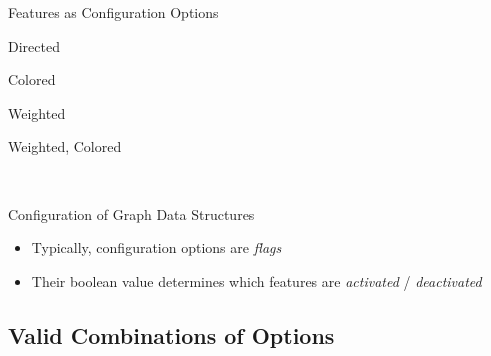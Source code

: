\begin{frame}{Features as Configuration Options}
	\begin{mycolumns}[columns=3,widths={25,25},animation=none]
		\begin{exampletight}{Directed}
		\end{exampletight}
		\begin{exampletight}{Colored}
		\end{exampletight}
	\mynextcolumn
		\begin{exampletight}{Weighted}
		\end{exampletight}
		\begin{exampletight}{Weighted, Colored}
		\end{exampletight}
	\mynextcolumn
		\pause{}
		\hfill
		
		~\pause
		
		\begin{note}{Configuration of Graph Data Structures}
			\begin{itemize}
				\item Typically, configuration options are \emph{flags}
				\item Their boolean value determines which features are \emph{activated} / \emph{deactivated}
			\end{itemize}
		\end{note}
	\end{mycolumns}
\end{frame}

\subsection{Valid Combinations of Options}

